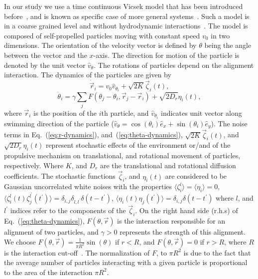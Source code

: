 \documentclass[reprint,floatfix,amsmath,amssymb,aps,pre,showkeys,showpacs,superscriptaddress]{revtex4-1}
\newcommand{\ave}[1]{\langle #1 \rangle}
\newcommand{\hl}[1]{\textcolor{hlcolor}{#1}}
\newcommand{\req}[1]{Eq.~(\ref{#1})}
\newcommand{\reqs}[2]{Eq.~(\ref{#1}), and~(\ref{#2})}
\begin{document}
In our study we use \hl{a time continuous} Vicsek model that has been introduced before~\cite{peruani2008mean}, and is known as specific case of more general systems~\cite{Farrell2012,Yang2015,Morin2015}. \hl{Such a model is in a coarse grained level and without hydrodynamic interactions~\cite{Hernandez-Ortiz2005transport,Underhill2008diffusion}.} The model is composed of self-propelled particles moving with constant speed $v_0$ in two dimensions. The orientation of the velocity vector is defined by $\theta$ being the angle between the vector and the $x$-axis.  The direction for motion of the particle is denoted by the unit vector $\hat{v}_\theta$. The rotations of particles depend on the alignment interaction. The dynamics of the particles are given by
\begin{equation}
\dot{\vec{r}}_i = v_0 \hat{v}_{\theta_i} + \sqrt{2K} \vec{\zeta}_i(t),
\label{eq:r-dynamics}
\end{equation}
\begin{equation}
\dot{\theta}_i = \gamma \sum_j F(\theta_j - \theta_i, \vec{r}_j - \vec{r}_i) + \sqrt{2 D_r} \eta_{i}(t),
\label{eq:theta-dynamics}
\end{equation}
where $\vec{r}_i$ is the position of the $i$th particle, and $\hat{v}_{\theta_i}$ indicates unit vector along swimming direction of the particle ($\hat{v}_{\theta} = \cos(\theta_i) \hat{e}_x + \sin(\theta_i) \hat{e}_y$). The noise terms in \reqs{eq:r-dynamics}{eq:theta-dynamics}, $\sqrt{2K} \vec{\zeta}_i(t)$,  and $\sqrt{2 D_r} \eta_{i}(t)$ represent stochastic \hl{effects of the environment or/and  of the propulsive mechanism} on translational, and rotational movement of particles\hl{,} respectively. Where $K$, and \hl{$D_r$} are the translational and rotational diffusion coefficients. The stochastic functions $\vec{\zeta}_i$, and $\eta_{i}(t)$ are \hl{considered to be} Gaussian uncorrelated white noises with the properties $\ave{\zeta_i^l} = \ave{\eta_i} = 0$, $\ave{\zeta_i^l(t) \zeta_j^{l^\prime}(t^\prime)} = \delta_{i,j} \delta_{l,l^\prime} \delta(t - t^\prime)$, $\ave{\eta_i(t) \eta_j(t^\prime)} = \delta_{i,j} \delta(t - t^\prime)$ where $l$, and $l^\prime$ indices refer to the components of the $\vec{\zeta}_i$. On the right hand side (r.h.s) of \req{eq:theta-dynamics}, $F(\theta,\vec{r})$ is the interaction responsible for \hl{an} alignment of two particles, and \hl{$\gamma > 0$} represents the strength of this alignment. We choose $F(\theta,\vec{r}) = \frac{1}{\pi R^2} \sin \left( \theta \right)$ if $r<R$, and $F(\theta,\vec{r}) = 0$ if $r>R$, where $R$ is the interaction cut-off~\cite{Farrell2012}. The normalization of $F$, to $\pi R^2$ is due to the fact that the average number of particles interacting with a given particle is proportional to \hl{the} area of \hl{the} interaction $\pi R^2$.
\end{document}
